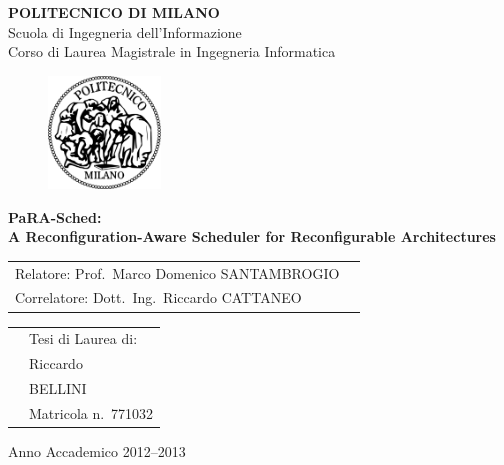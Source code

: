 \documentclass[a4paper]{report}
\begin{document}
\begin{titlepage}

\begin{center}
\LARGE
\textbf{POLITECNICO DI MILANO} \\
\Large
Scuola di Ingegneria dell'Informazione \\
Corso di Laurea Magistrale in Ingegneria Informatica
\end{center}

\addvspace{1.5cm}
\begin{figure}[h]
\begin{center}
\includegraphics[width=3cm]{figure/PoliMi}
\end{center}
\end{figure}

\addvspace{0.75cm}
\begin{center}
\LARGE
\textbf{PaRA-Sched:\\
A Reconfiguration-Aware Scheduler for Reconfigurable Architectures}
\end{center}

\addvspace{4cm}
\Large
\begin{center}
\begin{tabular}{p{}p{}}
Relatore: Prof.~Marco Domenico SANTAMBROGIO& \\
Correlatore: Dott.~Ing.~Riccardo CATTANEO& \\ %
\end{tabular}
\end{center}

\addvspace{2cm}
\Large
\begin{center}
\begin{tabular}{p{}p{}}
& Tesi di Laurea di: \\
& Riccardo \\ 
& BELLINI \\
& Matricola n.~771032
\end{tabular}
\end{center}

\vfill
\Large
\begin{center}
Anno Accademico 2012--2013
\end{center}
\end{titlepage}
\end{document}
